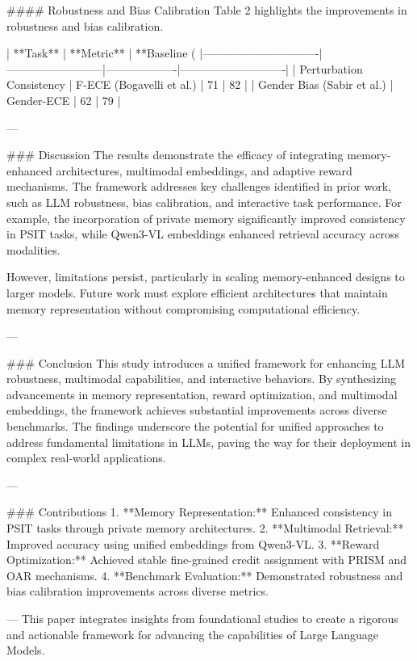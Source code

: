 #### Robustness and Bias Calibration  
Table 2 highlights the improvements in robustness and bias calibration.  

| **Task**                     | **Metric**               | **Baseline (%
|-------------------------------|--------------------------|-------------------|----------------------------|  
| Perturbation Consistency      | F-ECE (Bogavelli et al.) | 71               | 82                         |  
| Gender Bias (Sabir et al.)    | Gender-ECE              | 62               | 79                         |  

---

### Discussion  
The results demonstrate the efficacy of integrating memory-enhanced architectures, multimodal embeddings, and adaptive reward mechanisms. The framework addresses key challenges identified in prior work, such as LLM robustness, bias calibration, and interactive task performance. For example, the incorporation of private memory significantly improved consistency in PSIT tasks, while Qwen3-VL embeddings enhanced retrieval accuracy across modalities.

However, limitations persist, particularly in scaling memory-enhanced designs to larger models. Future work must explore efficient architectures that maintain memory representation without compromising computational efficiency.

---

### Conclusion  
This study introduces a unified framework for enhancing LLM robustness, multimodal capabilities, and interactive behaviors. By synthesizing advancements in memory representation, reward optimization, and multimodal embeddings, the framework achieves substantial improvements across diverse benchmarks. The findings underscore the potential for unified approaches to address fundamental limitations in LLMs, paving the way for their deployment in complex real-world applications.

---

### Contributions  
1. **Memory Representation:** Enhanced consistency in PSIT tasks through private memory architectures.  
2. **Multimodal Retrieval:** Improved accuracy using unified embeddings from Qwen3-VL.  
3. **Reward Optimization:** Achieved stable fine-grained credit assignment with PRISM and OAR mechanisms.  
4. **Benchmark Evaluation:** Demonstrated robustness and bias calibration improvements across diverse metrics.  

---  
This paper integrates insights from foundational studies to create a rigorous and actionable framework for advancing the capabilities of Large Language Models.